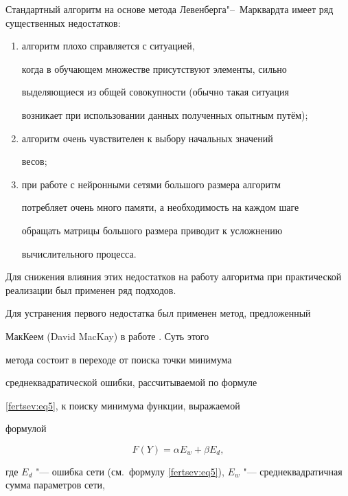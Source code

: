 Стандартный алгоритм на основе метода Левенберга"--~Марквардта имеет ряд существенных недостатков:

\begin{enumerate}

\item алгоритм плохо справляется с ситуацией,

когда в обучающем множестве присутствуют элементы, сильно

выделяющиеся из общей совокупности (обычно такая ситуация

возникает при использовании данных полученных опытным путём);



\item алгоритм очень чувствителен к выбору начальных значений

весов;



\item при работе с нейронными сетями большого размера алгоритм

потребляет очень много памяти, а необходимость на каждом шаге

обращать матрицы большого размера приводит к усложнению

вычислительного процесса.

\end{enumerate}



Для снижения влияния этих недостатков на работу алгоритма при практической реализации был применен ряд подходов.



Для устранения первого недостатка был применен метод, предложенный

МакКеем (David MacKay) в работе \cite{afertsev:MacKay}. Суть этого

метода состоит в переходе от поиска точки минимума

среднеквадратической ошибки, рассчитываемой по формуле

\eqref{fertsev:eq5}, к поиску минимума функции, выражаемой

формулой 

\begin{equation}

\label{fertsev:eq9}

F(Y) =\alpha E_w +\beta E_d,

\end{equation}

где $E_d$ "--- ошибка сети (см.~формулу \eqref{fertsev:eq5}), $E_w$ "--- среднеквадратичная сумма параметров сети,


